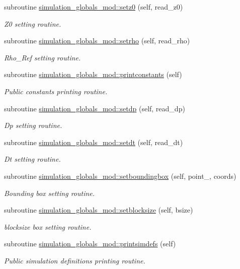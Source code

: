 \begin{DoxyCompactItemize}
subroutine \hyperlink{namespacesimulation__globals__mod_a64b1d91147c1cd5898fec8f23d56a65d}{simulation\+\_\+globals\+\_\+mod\+::setz0} (self, read\+\_\+z0)
\begin{DoxyCompactList}\small\item\em Z0 setting routine. \end{DoxyCompactList}\item 
subroutine \hyperlink{namespacesimulation__globals__mod_a68a87c39cf88bad353e28e367a721ed4}{simulation\+\_\+globals\+\_\+mod\+::setrho} (self, read\+\_\+rho)
\begin{DoxyCompactList}\small\item\em Rho\+\_\+\+Ref setting routine. \end{DoxyCompactList}\item 
subroutine \hyperlink{namespacesimulation__globals__mod_a20ba28d72a9bea823d9373a94f97026e}{simulation\+\_\+globals\+\_\+mod\+::printconstants} (self)
\begin{DoxyCompactList}\small\item\em Public constants printing routine. \end{DoxyCompactList}\item 
subroutine \hyperlink{namespacesimulation__globals__mod_acb8e3762572266b40a0deb166dded33a}{simulation\+\_\+globals\+\_\+mod\+::setdp} (self, read\+\_\+dp)
\begin{DoxyCompactList}\small\item\em Dp setting routine. \end{DoxyCompactList}\item 
subroutine \hyperlink{namespacesimulation__globals__mod_aecf75eeccef4eeae6d10ab26cf2dcfcf}{simulation\+\_\+globals\+\_\+mod\+::setdt} (self, read\+\_\+dt)
\begin{DoxyCompactList}\small\item\em Dt setting routine. \end{DoxyCompactList}\item 
subroutine \hyperlink{namespacesimulation__globals__mod_a412b0779703630189e2ea14e4b390864}{simulation\+\_\+globals\+\_\+mod\+::setboundingbox} (self, point\+\_\+, coords)
\begin{DoxyCompactList}\small\item\em Bounding box setting routine. \end{DoxyCompactList}\item 
subroutine \hyperlink{namespacesimulation__globals__mod_aa65b43534d2d2b6366a4ebc791194805}{simulation\+\_\+globals\+\_\+mod\+::setblocksize} (self, bsize)
\begin{DoxyCompactList}\small\item\em blocksize box setting routine. \end{DoxyCompactList}\item 
subroutine \hyperlink{namespacesimulation__globals__mod_ad331ccf019de7ed531e37c655600f90f}{simulation\+\_\+globals\+\_\+mod\+::printsimdefs} (self)
\begin{DoxyCompactList}\small\item\em Public simulation definitions printing routine. \end{DoxyCompactList}\end{DoxyCompactItemize}

